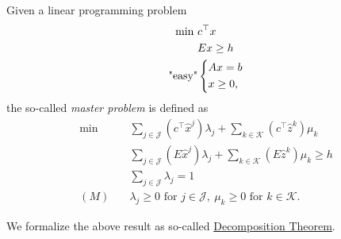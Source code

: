 \begin{definition}\label{def:master-problem}
	Given a linear programming problem
	\[
		\begin{aligned}
			\min~         & c^{\top}x     \\
			              & Ex\geq h      \\
			\text{"easy"} & \begin{dcases}
				                Ax = b \\
				                x\geq 0,
			                \end{dcases}
		\end{aligned}
	\]
	the so-called \emph{master problem} is defined as
	\[
		\begin{aligned}
			\min~    & \sum\limits_{j\in\mathcal{J}}\left(c^{\top}\hat{x}^j\right)\lambda_{j} + \sum\limits_{k\in\mathcal{K}}\left(c^{\top} \hat{z}^k  \right)\mu_k \\
			         & \sum\limits_{j\in\mathcal{J}}\left(E\hat{x}^j\right)\lambda_{j} + \sum\limits_{k\in\mathcal{K}}\left(E \hat{z}^k \right)\mu_k \geq h         \\
			         & \sum\limits_{j\in\mathcal{J}}\lambda_{j} = 1                                                                                                 \\
			(M)\quad & \lambda_{j}\geq 0 \text{ for }j\in\mathcal{J},\ \mu_k\geq 0 \text{ for }k\in\mathcal{K}.
		\end{aligned}
	\]
\end{definition}
We formalize the above result as so-called \hyperref[thm:decomposition-theorem]{Decomposition Theorem}.
